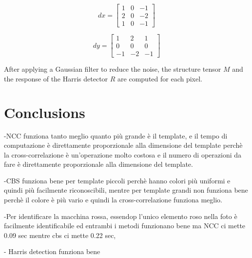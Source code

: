 \begin{minipage}{0.45\textwidth}
	\centering
	\begin{equation}
		dx = \begin{bmatrix}
			1 & 0 & -1 \\
			2 & 0 & -2 \\
			1 & 0 & -1
		\end{bmatrix}
		\label{eq:dx}
	\end{equation}
\end{minipage}
\hfill 
\begin{minipage}{0.45\textwidth}
	\centering
	\begin{equation}
		dy = \begin{bmatrix}
			1 & 2 & 1 \\
			0 & 0 & 0 \\
			-1 & -2 & -1
		\end{bmatrix}
		\label{eq:dy}
	\end{equation}
\end{minipage}

After applying a Gaussian filter to reduce the noise, the structure tensor 
$𝑀$ and the response of the Harris detector $R$ are computed for each pixel.

\newpage
\section*{Conclusions}


-NCC funziona tanto meglio quanto più grande è il template, e il tempo di computazione è direttamente proporzionale alla dimensione del template perchè la cross-correlazione è un'operazione molto costosa e il numero di operazioni da fare è direttamente proporzionale alla dimensione del template.

-CBS funziona bene per template piccoli perchè hanno colori più uniformi e quindi più facilmente riconoscibili, mentre per template grandi non funziona bene perchè il colore è più vario e quindi la cross-correlazione funziona meglio.

-Per identificare la macchina rossa, essendop l'unico elemento roso nella foto  è facilmente identificabile ed entrambi i metodi funzionano bene ma NCC ci mette 0.09 sec mentre cbs ci mette 0.22 sec, 

- Harris detection funziona bene

